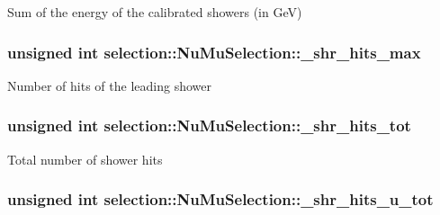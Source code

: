 Sum of the energy of the calibrated showers (in Ge\-V) \hypertarget{classselection_1_1NuMuSelection_ab314b2264e547d258e88d2f773352b9f}{
\subsubsection[{\-\_\-shr\-\_\-hits\-\_\-max}]{\setlength{\rightskip}{0pt plus 5cm}unsigned int selection\-::\-Nu\-Mu\-Selection\-::\-\_\-shr\-\_\-hits\-\_\-max\hspace{0.3cm}{\ttfamily [private]}}}\label{classselection_1_1NuMuSelection_ab314b2264e547d258e88d2f773352b9f}
Number of hits of the leading shower \hypertarget{classselection_1_1NuMuSelection_a9233cd2b1aa05f66da7c04f99ff99058}{
\subsubsection[{\-\_\-shr\-\_\-hits\-\_\-tot}]{\setlength{\rightskip}{0pt plus 5cm}unsigned int selection\-::\-Nu\-Mu\-Selection\-::\-\_\-shr\-\_\-hits\-\_\-tot\hspace{0.3cm}{\ttfamily [private]}}}\label{classselection_1_1NuMuSelection_a9233cd2b1aa05f66da7c04f99ff99058}
Total number of shower hits \hypertarget{classselection_1_1NuMuSelection_aa88c0578a68ec301fecbe3262aa44762}{
\subsubsection[{\-\_\-shr\-\_\-hits\-\_\-u\-\_\-tot}]{\setlength{\rightskip}{0pt plus 5cm}unsigned int selection\-::\-Nu\-Mu\-Selection\-::\-\_\-shr\-\_\-hits\-\_\-u\-\_\-tot\hspace{0.3cm}{\ttfamily [private]}}}\label{classselection_1_1NuMuSelection_aa88c0578a68ec301fecbe3262aa44762}
